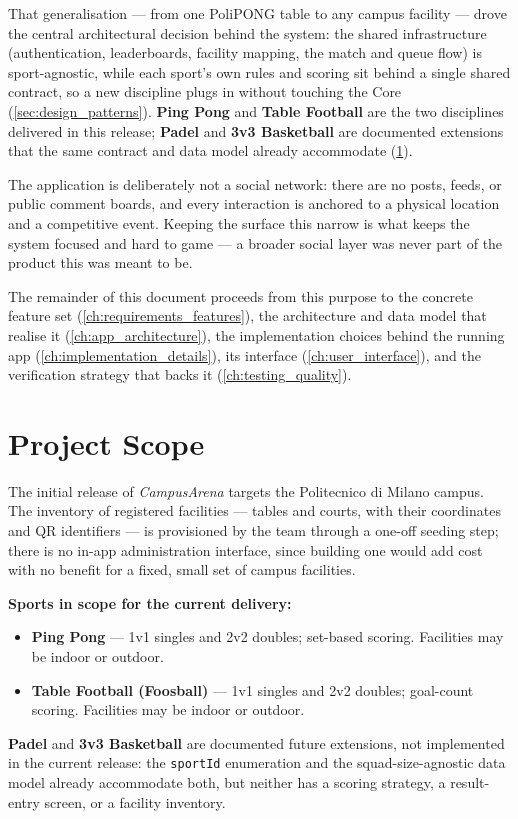 \documentclass{configurations/polimi3i_thesis}
\renewcommand{\_}{\textunderscore\allowbreak}
\begin{document}
That generalisation — from one PoliPONG table to any campus facility — drove the central architectural decision behind the system: the shared infrastructure (authentication, leaderboards, facility mapping, the match and queue flow) is sport-agnostic, while each sport's own rules and scoring sit behind a single shared contract, so a new discipline plugs in without touching the Core (\cref{sec:design_patterns}). \textbf{Ping Pong} and \textbf{Table Football} are the two disciplines delivered in this release; \textbf{Padel} and \textbf{3v3 Basketball} are documented extensions that the same contract and data model already accommodate (\cref{sec:project_scope}).

The application is deliberately not a social network: there are no posts, feeds, or public comment boards, and every interaction is anchored to a physical location and a competitive event. Keeping the surface this narrow is what keeps the system focused and hard to game — a broader social layer was never part of the product this was meant to be.

The remainder of this document proceeds from this purpose to the concrete feature set (\cref{ch:requirements_features}), the architecture and data model that realise it (\cref{ch:app_architecture}), the implementation choices behind the running app (\cref{ch:implementation_details}), its interface (\cref{ch:user_interface}), and the verification strategy that backs it (\cref{ch:testing_quality}).

\section{Project Scope}
\label{sec:project_scope}

The initial release of \textit{CampusArena} targets the Politecnico di Milano campus. The inventory of registered facilities — tables and courts, with their coordinates and QR identifiers — is provisioned by the team through a one-off seeding step; there is no in-app administration interface, since building one would add cost with no benefit for a fixed, small set of campus facilities.

\textbf{Sports in scope for the current delivery:}
\begin{itemize}
    \item \textbf{Ping Pong} — 1v1 singles and 2v2 doubles; set-based scoring. Facilities may be indoor or outdoor.
    \item \textbf{Table Football (Foosball)} — 1v1 singles and 2v2 doubles; goal-count scoring. Facilities may be indoor or outdoor.
\end{itemize}
\textbf{Padel} and \textbf{3v3 Basketball} are documented future extensions, not implemented in the current release: the \texttt{sportId} enumeration and the squad-size-agnostic data model already accommodate both, but neither has a scoring strategy, a result-entry screen, or a facility inventory.
\end{document}
